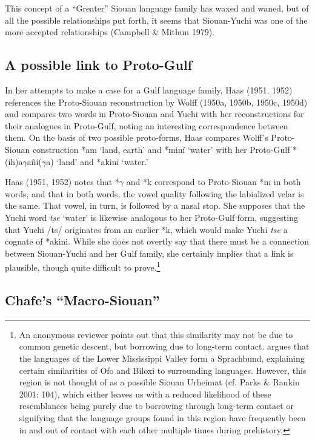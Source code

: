 \documentclass[output=paper]{LSP/langsci}
\begin{document}
This concept of a ``Greater'' Siouan language family has waxed and waned, but of all the possible relationships put forth, it seems that Siouan-Yuchi was one of the more accepted relationships (Campbell \& Mithun 1979).

\subsection{A possible link to Proto-Gulf}

In her attempts to make a case for a Gulf language family, Haas (1951, 1952) references the Proto-Siouan reconstruction by Wolff (1950a, 1950b, 1950c, 1950d) and compares two words in Proto-Siouan and Yuchi with her reconstructions for their analogues in Proto-Gulf, noting an interesting correspondence between them. On the basis of two possible proto-forms, Haas compares Wolff's Proto-Siouan construction *am `land, earth' and *min\'i `water' with her Proto-Gulf *(ih)a$\gamma$a\~ni($\gamma$a) `land' and *ak{}ini `water.' 

Haas (1951, 1952) notes that *$\gamma$ and *k{} correspond to Proto-Siouan *m in both words, and that in both words, the vowel quality following the labialized velar is the same. That vowel, in turn, is followed by a nasal stop. She supposes that the Yuchi word \emph{tse} `water' is likewise analogous to her Proto-Gulf form, suggesting that Yuchi /ts/ originates from an earlier *k, which would make Yuchi \emph{tse} a cognate of *ak{}ini. While she does not overtly say that there must be a connection between Siouan-Yuchi and her Gulf family, she certainly implies that a link is plausible, though quite difficult to prove.\footnote{An anonymous reviewer points out that this similarity may not be due to common genetic descent, but borrowing due to long-term contact. \citet{Kaufman2014} argues that the languages of the Lower Mississippi Valley form a Sprachbund, explaining certain similarities of Ofo and Biloxi to surrounding languages. However, this region is not thought of as a possible Siouan Urheimat (cf. Parks \& Rankin 2001: 104), which either leaves us with a reduced likelihood of these resemblances being purely due to borrowing through long-term contact or signifying that the language groups found in this region have frequently been in and out of contact with each other multiple times during prehistory.}

\subsection{Chafe's ``Macro-Siouan''}
\end{document}
